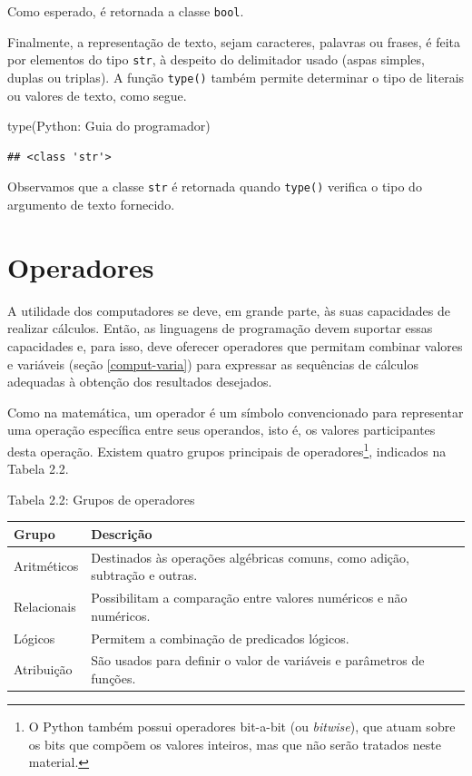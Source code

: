 \documentclass[
]{book}
\newenvironment{Shaded}{\begin{snugshade}}{\end{snugshade}}
\newcommand{\BuiltInTok}[1]{#1}
\newcommand{\NormalTok}[1]{#1}
\newcommand{\StringTok}[1]{\textcolor[rgb]{0.31,0.60,0.02}{#1}}
\begin{document}
Como esperado, é retornada a classe \texttt{bool}.

Finalmente, a representação de texto, sejam caracteres, palavras ou frases, é feita por elementos do tipo \texttt{str}, à despeito do delimitador usado (aspas simples, duplas ou triplas). A função \texttt{type()} também permite determinar o tipo de literais ou valores de texto, como segue.

\begin{Shaded}
\begin{Highlighting}[]
\BuiltInTok{type}\NormalTok{(}\StringTok{\textquotesingle{}Python: Guia do programador\textquotesingle{}}\NormalTok{)}
\end{Highlighting}
\end{Shaded}

\begin{verbatim}
## <class 'str'>
\end{verbatim}

Observamos que a classe \texttt{str} é retornada quando \texttt{type()} verifica o tipo do argumento de texto fornecido.

\hypertarget{comput-opera}{%
\section{Operadores}\label{comput-opera}}

A utilidade dos computadores se deve, em grande parte, às suas capacidades de realizar cálculos. Então, as linguagens de programação devem suportar essas capacidades e, para isso, deve oferecer operadores que permitam combinar valores e variáveis (seção \ref{comput-varia}) para expressar as sequências de cálculos adequadas à obtenção dos resultados desejados.

Como na matemática, um operador é um símbolo convencionado para representar uma operação específica entre seus operandos, isto é, os valores participantes desta operação. Existem quatro grupos principais de operadores\footnote{O Python também possui operadores bit-a-bit (ou \emph{bitwise}), que atuam sobre os bits que compõem os valores inteiros, mas que não serão tratados neste material.}, indicados na Tabela 2.2.

Tabela 2.2: Grupos de operadores

\begin{longtable}[]{@{}
  >{\raggedright\arraybackslash}p{}
  >{\raggedright\arraybackslash}p{}@{}}
\toprule
Grupo & Descrição \\
\midrule
\endhead
Aritméticos & Destinados às operações algébricas comuns, como adição, subtração e outras. \\
Relacionais & Possibilitam a comparação entre valores numéricos e não numéricos. \\
Lógicos & Permitem a combinação de predicados lógicos. \\
Atribuição & São usados para definir o valor de variáveis e parâmetros de funções. \\
\bottomrule
\end{longtable}
\end{document}
